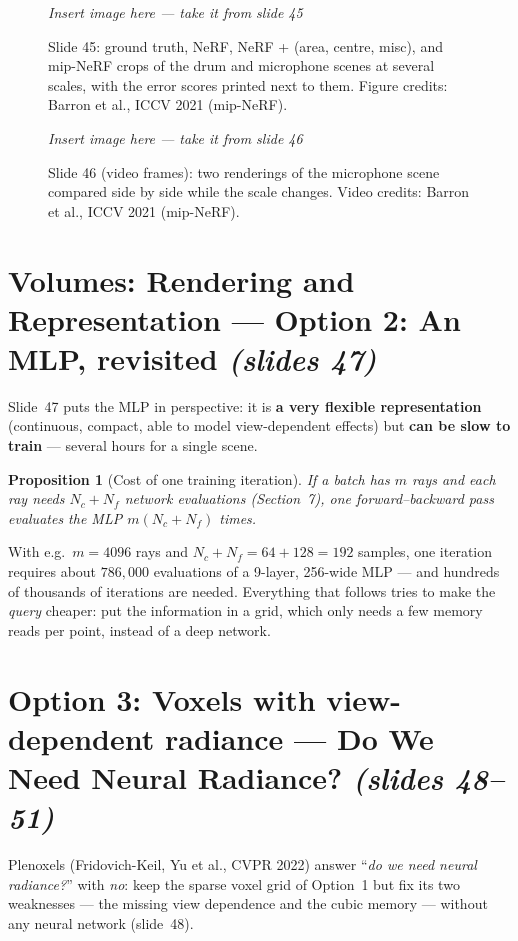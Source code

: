 \documentclass[11pt,a4paper]{article}
\newcommand{\sref}[1]{\texorpdfstring{\emph{(slides #1)}}{(slides #1)}}
\theoremstyle{definition}
\theoremstyle{plain}
\newtheorem{proposition}{Proposition}[section]
\newcommand{\slideimg}[3]{%
\begin{figure}[H]
\centering
\begin{tcolorbox}[enhanced,colback=white,colframe=white,boxrule=0pt,sharp corners,overlay={\draw[dashed,gray,thick] (frame.south west) rectangle (frame.north east);},
  width=0.92\linewidth,height=#2,valign=center,halign=center]
{\color{gray}\itshape Insert image here --- take it from slide #1}
\end{tcolorbox}
\caption{#3}
\end{figure}}
\begin{document}
\slideimg{45}{5.4cm}{Slide 45: ground truth, NeRF, NeRF + (area, centre, misc), and mip-NeRF crops of the drum and microphone scenes at several scales, with the error scores printed next to them. Figure credits: Barron et al., ICCV 2021 (mip-NeRF).}

\slideimg{46}{4.2cm}{Slide 46 (video frames): two renderings of the microphone scene compared side by side while the scale changes. Video credits: Barron et al., ICCV 2021 (mip-NeRF).}

\section{Volumes: Rendering and Representation --- Option 2: An MLP, revisited \sref{47}}

Slide~47 puts the MLP in perspective: it is \textbf{a very flexible representation} (continuous, compact, able to model view-dependent effects) but \textbf{can be slow to train} --- several hours for a single scene.

\begin{proposition}[Cost of one training iteration]
If a batch has $m$ rays and each ray needs $N_c+N_f$ network evaluations (Section~7), one forward--backward pass evaluates the MLP $m(N_c+N_f)$ times. 
\end{proposition}
\begin{intuition}
With e.g.\ $m=4096$ rays and $N_c+N_f=64+128=192$ samples, one iteration requires about $786{,}000$ evaluations of a 9-layer, 256-wide MLP --- and hundreds of thousands of iterations are needed. Everything that follows tries to make the \emph{query} cheaper: put the information in a grid, which only needs a few memory reads per point, instead of a deep network.
\end{intuition}

\section{Option 3: Voxels with view-dependent radiance --- Do We Need Neural Radiance? \sref{48--51}}

Plenoxels (Fridovich-Keil, Yu et al., CVPR 2022) answer ``\emph{do we need neural radiance?}'' with \emph{no}: keep the sparse voxel grid of Option~1 but fix its two weaknesses --- the missing view dependence and the cubic memory --- without any neural network (slide~48).
\end{document}

